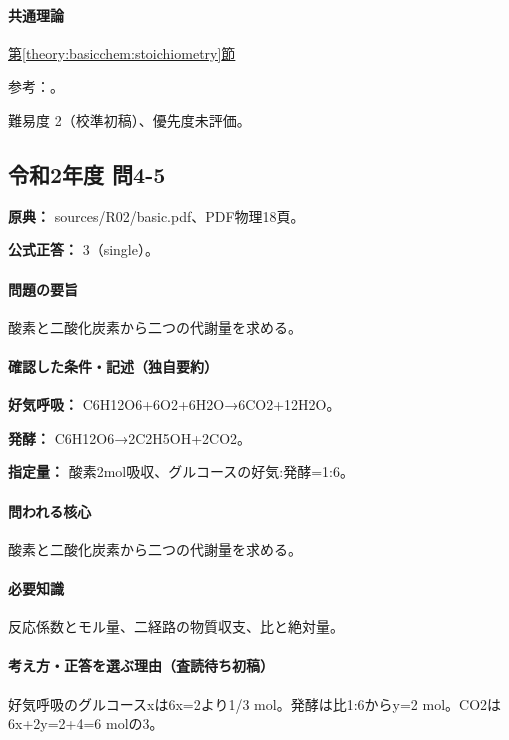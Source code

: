 \paragraph{共通理論} \hyperref[theory:basicchem:stoichiometry]{第\ref*{theory:basicchem:stoichiometry}節}

\par 参考：\cite{chem55_stoich}。

\par 難易度 2（校準初稿）、優先度未評価。

\subsection{令和2年度 問4-5}
\label{q:r02-reg-basic-4-5}

\noindent\textbf{原典：} sources/R02/basic.pdf、PDF物理18頁。

\textbf{公式正答：} 3（single）。

\paragraph{問題の要旨} 酸素と二酸化炭素から二つの代謝量を求める。

\paragraph{確認した条件・記述（独自要約）}\mbox{}\par

\noindent\textbf{好気呼吸：} C6H12O6+6O2+6H2O→6CO2+12H2O。\par

\noindent\textbf{発酵：} C6H12O6→2C2H5OH+2CO2。\par

\noindent\textbf{指定量：} 酸素2mol吸収、グルコースの好気:発酵=1:6。\par

\paragraph{問われる核心} 酸素と二酸化炭素から二つの代謝量を求める。

\paragraph{必要知識} 反応係数とモル量、二経路の物質収支、比と絶対量。

\paragraph{考え方・正答を選ぶ理由（査読待ち初稿）} 好気呼吸のグルコースxは6x=\allowbreak{}2より1/3 mol。発酵は比1:6からy=\allowbreak{}2 mol。CO2は6x+2y=\allowbreak{}2+4=\allowbreak{}6 molの3。

